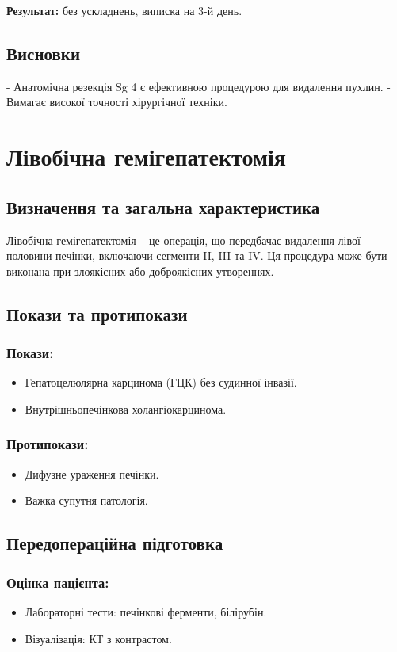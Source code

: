 \begin{refsection}
\textbf{Результат:} без ускладнень, виписка на 3-й день.

\subsection{Висновки}
- Анатомічна резекція Sg 4 є ефективною процедурою для видалення пухлин.
- Вимагає високої точності хірургічної техніки.

\section{Лівобічна гемігепатектомія}
\subsection{Визначення та загальна характеристика}
Лівобічна гемігепатектомія – це операція, що передбачає видалення лівої половини печінки, включаючи сегменти II, III та IV. Ця процедура може бути виконана при злоякісних або доброякісних утвореннях.

\subsection{Покази та протипокази}
\subsubsection{Покази:}
\begin{itemize}
    \item Гепатоцелюлярна карцинома (ГЦК) без судинної інвазії.
    \item Внутрішньопечінкова холангіокарцинома.
\end{itemize}

\subsubsection{Протипокази:}
\begin{itemize}
    \item Дифузне ураження печінки.
    \item Важка супутня патологія.
\end{itemize}

\subsection{Передопераційна підготовка}
\subsubsection{Оцінка пацієнта:}
\begin{itemize}
    \item Лабораторні тести: печінкові ферменти, білірубін.
    \item Візуалізація: КТ з контрастом.
\end{itemize}


\end{refsection}
